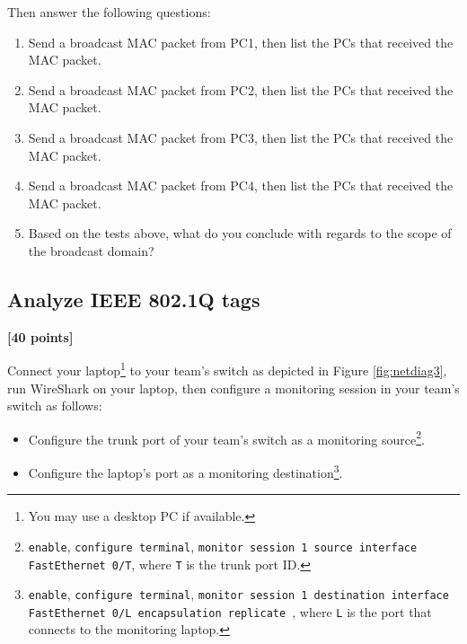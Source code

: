 \documentclass[pdftex,12pt,a4paper]{article}
\begin{document}
            Then answer the following questions:
            \begin{enumerate}
                \item Send a broadcast MAC packet from PC1, then list the PCs
                    that received the MAC packet.
                \item Send a broadcast MAC packet from PC2, then list the PCs
                    that received the MAC packet.
                \item Send a broadcast MAC packet from PC3, then list the PCs
                    that received the MAC packet.
                \item Send a broadcast MAC packet from PC4, then list the PCs
                    that received the MAC packet.
                \item Based on the tests above, what do you conclude with
                    regards to the scope of the broadcast domain?
            \end{enumerate}

        \subsection{Analyze IEEE 802.1Q tags}\label{sec:analyze}
            \begin{flushright}
                \textbf{[40 points]}
            \end{flushright}

            Connect your laptop\footnote{You may use a desktop PC if
            available.} to your team's switch as depicted in Figure
            \ref{fig:netdiag3}, run WireShark on your laptop, then configure a
            monitoring session in your team's switch as follows:
            \begin{itemize}
                \item Configure the trunk port of your team's switch as a
                    monitoring source\footnote{
                    \texttt{enable}, \texttt{configure terminal},
                    \texttt{monitor session 1 source interface FastEthernet 0/T},
                    where \texttt{T} is the trunk port ID.}.
                \item Configure the laptop's port as a monitoring
                    destination\footnote{\texttt{enable},
                    \texttt{configure terminal}, \texttt{monitor session 1
                    destination interface FastEthernet 0/L encapsulation
                    replicate }, where \texttt{L} is the
                    port that connects to the monitoring laptop.}.
            \end{itemize}
\end{document}
